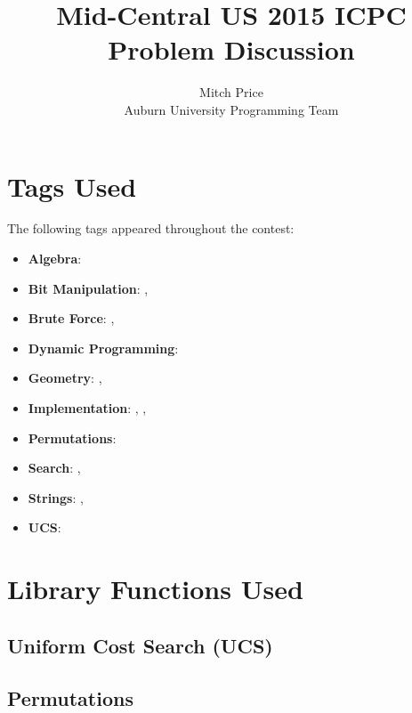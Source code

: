 \documentclass[10pt,a4paper]{article}
\begin{document}
\title{Mid-Central US 2015 ICPC Problem Discussion}
\author{Mitch Price\\ Auburn University Programming Team}
\maketitle
\pagebreak
\tableofcontents{}
\pagebreak










\section{Tags Used}
The following tags appeared throughout the contest:
\begin{itemize}
  \item \textbf{Algebra}: 
  \item \textbf{Bit Manipulation}: , 
  \item \textbf{Brute Force}: , 
  \item \textbf{Dynamic Programming}: 
  \item \textbf{Geometry}: , 
  \item \textbf{Implementation}: , ,
  \item \textbf{Permutations}: 
  \item \textbf{Search}: , 
  \item \textbf{Strings}: , 
  \item \textbf{UCS}: 
\end{itemize}
\pagebreak
\section{Library Functions Used}
\subsection{Uniform Cost Search (UCS)}

\pagebreak

\pagebreak

\pagebreak
\subsection{Permutations}

\pagebreak

\end{document}

